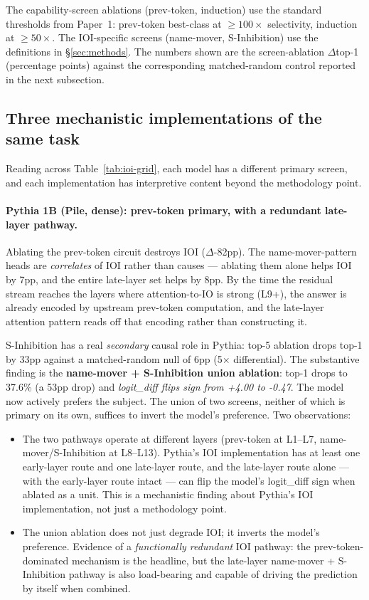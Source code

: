 \documentclass[11pt]{article}
\begin{document}
The capability-screen ablations (prev-token, induction) use the standard thresholds from Paper~1: prev-token best-class at $\geq 100\times$ selectivity, induction at $\geq 50\times$. The IOI-specific screens (name-mover, S-Inhibition) use the definitions in \S\ref{sec:methods}. The numbers shown are the screen-ablation $\Delta$top-1 (percentage points) against the corresponding matched-random control reported in the next subsection.

\subsection{Three mechanistic implementations of the same task}
\label{sec:ioi-three-impls}

Reading across Table~\ref{tab:ioi-grid}, each model has a different primary screen, and each implementation has interpretive content beyond the methodology point.

\paragraph{Pythia 1B (Pile, dense): prev-token primary, with a redundant late-layer pathway.}
Ablating the prev-token circuit destroys IOI ($\Delta$-82pp). The name-mover-pattern heads are \emph{correlates} of IOI rather than causes --- ablating them alone helps IOI by 7pp, and the entire late-layer set helps by 8pp. By the time the residual stream reaches the layers where attention-to-IO is strong (L9+), the answer is already encoded by upstream prev-token computation, and the late-layer attention pattern reads off that encoding rather than constructing it.

S-Inhibition has a real \emph{secondary} causal role in Pythia: top-5 ablation drops top-1 by 33pp against a matched-random null of 6pp (5$\times$ differential). The substantive finding is the \textbf{name-mover + S-Inhibition union ablation}: top-1 drops to 37.6\% (a 53pp drop) and \emph{logit\_diff flips sign from +4.00 to -0.47}. The model now actively prefers the subject. The union of two screens, neither of which is primary on its own, suffices to invert the model's preference. Two observations:
\begin{itemize}[topsep=2pt,itemsep=2pt]
\item The two pathways operate at different layers (prev-token at L1--L7, name-mover/S-Inhibition at L8--L13). Pythia's IOI implementation has at least one early-layer route and one late-layer route, and the late-layer route alone --- with the early-layer route intact --- can flip the model's logit\_diff sign when ablated as a unit. This is a mechanistic finding about Pythia's IOI implementation, not just a methodology point.
\item The union ablation does not just degrade IOI; it inverts the model's preference. Evidence of a \emph{functionally redundant} IOI pathway: the prev-token-dominated mechanism is the headline, but the late-layer name-mover + S-Inhibition pathway is also load-bearing and capable of driving the prediction by itself when combined.
\end{itemize}
\end{document}
